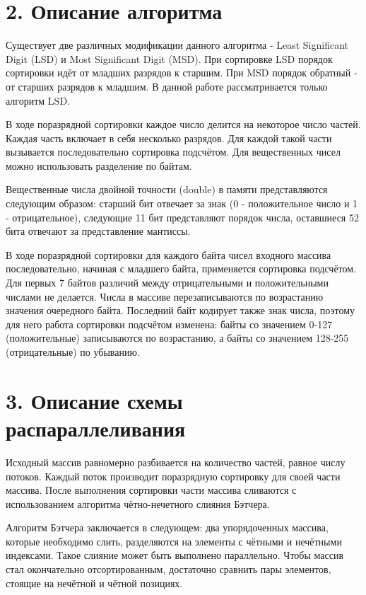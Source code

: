 \documentclass{report}
\begin{document}
    \newpage
    \section*{2. Описание алгоритма}

    \par Существует две различных модификации данного алгоритма - Least Significant Digit (LSD) и Most Significant Digit (MSD). При сортировке LSD порядок сортировки идёт от младших разрядов к старшим. При MSD порядок обратный - от старших разрядов к младшим. В данной работе рассматривается только алгоритм LSD.
    \par В ходе поразрядной сортировки каждое число делится на некоторое число частей. Каждая часть включает в себя несколько разрядов. Для каждой такой части вызывается последовательно сортировка подсчётом. Для вещественных чисел можно использовать разделение по байтам.
    \par Вещественные числа двойной точности (double) в памяти представляются следующим образом: старший бит отвечает за знак (0 - положительное число и 1 - отрицательное), следующие 11 бит представляют порядок числа, оставшиеся 52 бита отвечают за представление мантиссы.
    \par В ходе поразрядной сортировки для каждого байта чисел входного массива последовательно, начиная с младшего байта, применяется сортировка подсчётом. Для первых 7 байтов различий между отрицательными и положительными числами не делается.
    Числа в массиве перезаписываются по возрастанию значения очередного байта. Последний байт кодирует также знак числа, поэтому для него работа сортировки подсчётом изменена: байты со значением 0-127 (положительные) записываются по возрастанию, а байты со значением 128-255 (отрицательные) по убыванию.

    \newpage
    \section*{3. Описание схемы распараллеливания}
    \par Исходный массив равномерно разбивается на количество частей, равное числу потоков. Каждый поток производит поразрядную сортировку для своей части массива. После выполнения сортировки части массива сливаются с использованием алгоритма чётно-нечетного слияния Бэтчера.
    \par Алгоритм Бэтчера заключается в следующем: два упорядоченных массива, которые необходимо слить, разделяются на элементы с чётными и нечётными индексами. Такое слияние может быть выполнено параллельно. Чтобы массив стал окончательно отсортированным, достаточно сравнить пары элементов, стоящие на нечётной и чётной позициях.
    \newpage
\end{document}

